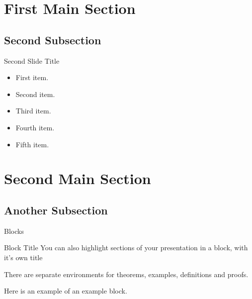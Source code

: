 \section{First Main Section}


\subsection{Second Subsection}

\begin{frame}{Second Slide Title}
  \begin{itemize}
  \item {
    First item.
    \pause %
  }
  \item {   
    Second item.
  }
  \item<3-> {
    Third item.
  }
  \item<4-> {
    Fourth item.
  }
  \item<5-> {
    Fifth item. 
  }
  \end{itemize}
\end{frame}

\section{Second Main Section}

\subsection{Another Subsection}

\begin{frame}{Blocks}
\begin{block}{Block Title}
You can also highlight sections of your presentation in a block, with it's own title
\end{block}
\begin{theorem}
There are separate environments for theorems, examples, definitions and proofs.
\end{theorem}
\begin{example}
Here is an example of an example block.
\end{example}
\end{frame}

